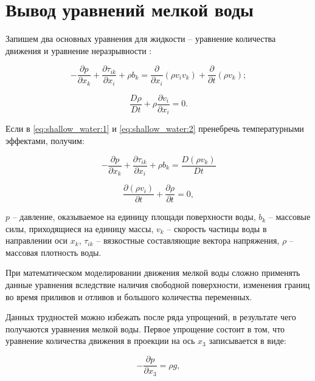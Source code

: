 \documentclass[14pt]{extreport}
\begin{document}
 
\chapter{Вывод уравнений мелкой воды}

Запишем два основных уравнения для жидкости -- уравнение количества движения и уравнение неразрывности \cite{bib:fem:konor}:

\begin{equation}\label{eq:shallow_water:1}
-\frac{\partial p}{\partial x_k} + \frac{\partial \tau_{ik}}{\partial x_i} + \rho b_k = \frac{\partial}{\partial x_i}(\rho v_i v_k) + \frac{\partial}{\partial t}(\rho v_k);
\end{equation}

\begin{equation}\label{eq:shallow_water:2}
\frac{D\rho}{Dt}+\rho \frac{\partial v_i}{\partial x_i} =0.
\end{equation}

Если в \eqref{eq:shallow_water:1} и \eqref{eq:shallow_water:2} пренебречь температурными эффектами, получим:

\begin{equation}\label{eq:shallow_water:3}
-\frac{\partial p}{\partial x_k} + \frac{\partial \tau_{ik}}{\partial x_i} + \rho b_k = \frac{D(\rho v_k)}{Dt}
\end{equation}

\begin{equation}\label{eq:shallow_water:4}
\frac{\partial (\rho v_i)}{\partial t} + \frac{\partial \rho}{\partial t}=0,
\end{equation}

 $p$ -- давление, оказываемое на единицу площади поверхности воды, $b_k$ -- массовые силы, приходящиеся на единицу массы, $v_k$ -- скорость частицы воды в направлении оси $x_k$, $\tau_{ik}$ -- вязкостные составляющие вектора напряжения, $\rho$ -- массовая плотность воды.

При математическом моделировании движения мелкой воды сложно применять данные уравнения вследствие наличия свободной поверхности, изменения границ во время приливов и отливов и большого количества переменных.

Данных трудностей можно избежать после ряда упрощений, в результате чего получаются уравнения мелкой воды. Первое упрощение состоит в том, что уравнение количества движения в проекции на ось $x_3$ записывается в виде:

\begin{equation}\label{eq:shallow_water:5}
-\frac{\partial p}{\partial x_3}=\rho g, 
\end{equation}
\end{document}
